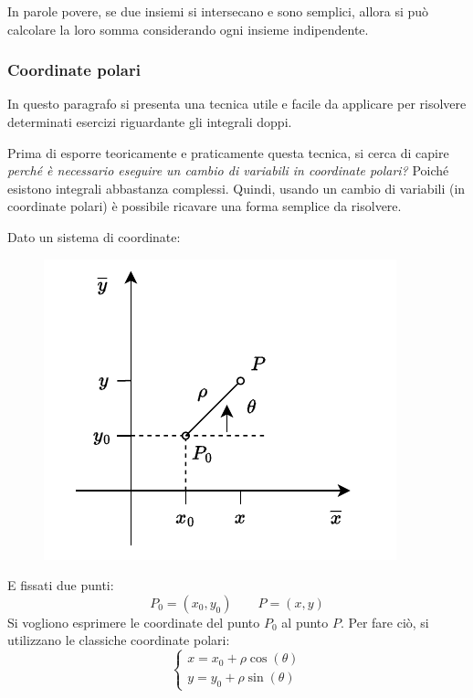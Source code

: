 \documentclass[a4paper]{article}
\begin{document}
	In parole povere, se due insiemi si intersecano e sono semplici, allora si può calcolare la loro somma considerando ogni insieme indipendente.\newpage
	
	\subsubsection{Coordinate polari}\label{subsubsection: ingrali doppi con le coordinate polari}

	In questo paragrafo si presenta una tecnica utile e facile da applicare per risolvere determinati esercizi riguardante gli integrali doppi.\newline

	\noindent
	Prima di esporre teoricamente e praticamente questa tecnica, si cerca di capire \emph{perché è necessario eseguire un cambio di variabili in coordinate polari?} Poiché esistono integrali abbastanza complessi. Quindi, usando un cambio di variabili (in coordinate polari) è possibile ricavare una forma semplice da risolvere.\newline

	\noindent
	Dato un sistema di coordinate:
	\begin{figure}[!htp]
		\centering
		\includegraphics[width=.5\textwidth]{img/integrali_doppi-coordinate_polari.pdf}
	\end{figure}
	
	\noindent
	E fissati due punti:
	\begin{equation*}
		P_{0} = \left(x_{0}, y_{0}\right)
		\hspace{2em}
		P = \left(x,y\right)
	\end{equation*}
	Si vogliono esprimere le coordinate del punto $P_{0}$ al punto $P$. Per fare ciò, si utilizzano le classiche coordinate polari:
	\begin{equation}\label{eq: coordinate polari}
		\begin{cases}
			x = x_{0} + \rho\cos\left(\theta\right) \\
			y = y_{0} + \rho\sin\left(\theta\right)
		\end{cases}
	\end{equation}
\end{document}
